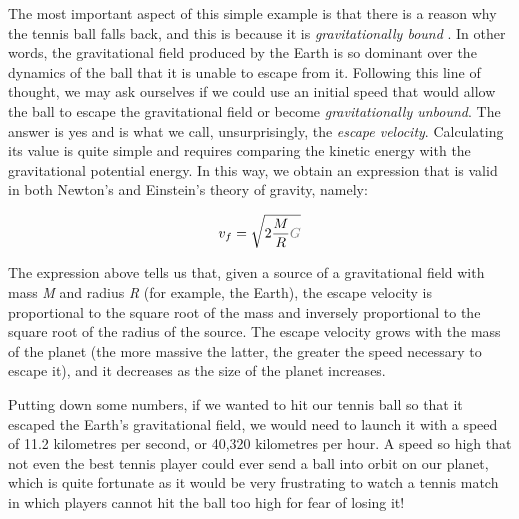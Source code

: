 The most important aspect of this simple example is that there is a reason why the
tennis ball falls back, and this is because it is \emph{gravitationally bound}
. In other words, the gravitational field produced by the Earth is so
dominant over the dynamics of the ball that it is unable to escape from it. Following
this line of thought, we may ask ourselves if we could use an initial speed that would
allow the ball to escape the gravitational field or become
\emph{gravitationally unbound}. The answer is yes and is what we call,
unsurprisingly, the \emph{escape velocity}. Calculating its value is quite simple and
requires comparing the kinetic energy with the gravitational potential
energy. In this way, we obtain an expression that is valid in both
Newton's and Einstein's theory of gravity, namely:

\begin{equation}\label{eq:06-02}
v_{f}=\sqrt{2\frac{M}{R}\textcolor{gray}{G}}
\end{equation}

The expression above tells us that, given a source of a gravitational field with mass
\emph{M} and radius \emph{R} (for example, the Earth), the escape velocity is
proportional to the square root of the mass and inversely proportional to the square
root of the radius of the source. The escape velocity grows with the mass of the planet
(the more massive the latter, the greater the speed necessary to escape it), and it
decreases as the size of the planet increases.

Putting down some numbers, if we wanted to hit our tennis ball so that it escaped the
Earth's gravitational field, we would need to launch it with a speed of 11.2 kilometres
per second, or 40,320 kilometres per hour. A speed so high that not even the best tennis
player could ever send a ball into orbit on our planet, which is quite fortunate as it
would be very frustrating to watch a tennis match in which players cannot hit the ball
too high for fear of losing it!

